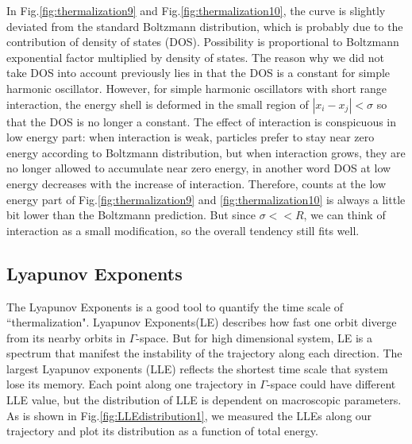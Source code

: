 \documentclass[aps,preprintnumbers,onecolumn,amsmath,amssymb,floatfix,pra]{revtex4-1}
\begin{document}
In Fig.\ref{fig:thermalization9} and Fig.\ref{fig:thermalization10}, the curve is slightly deviated from the standard Boltzmann distribution, which is probably due to the contribution of density of states (DOS). Possibility is proportional to Boltzmann exponential factor multiplied by density of states. The reason why we did not take DOS into account previously lies in that the DOS is a constant for simple harmonic oscillator. However, for simple harmonic oscillators with short range interaction, the energy shell is deformed in the small region of $|x_i-x_j|<\sigma$ so that the DOS is no longer a constant. The effect of interaction is conspicuous in low energy part: when interaction is weak, particles prefer to stay near zero energy according to Boltzmann distribution, but when interaction grows, they are no longer allowed to accumulate near zero energy, in another word DOS at low energy decreases with the increase of interaction. Therefore, counts at the low energy part of Fig.\ref{fig:thermalization9} and \ref{fig:thermalization10} is always a little bit lower than the Boltzmann prediction. But since $\sigma<<R$, we can think of interaction as a small modification, so the overall tendency still fits well. 

\subsection{Lyapunov Exponents}
The Lyapunov Exponents is a good tool to quantify the time scale of ``thermalization". Lyapunov Exponents(LE) describes how fast one orbit diverge from its nearby orbits in $\Gamma$-space. But for high dimensional system, LE is a spectrum that manifest the instability of the trajectory along each direction. The largest Lyapunov exponents (LLE) reflects the shortest time scale that system lose its memory. Each point along one trajectory in $\Gamma$-space could have different LLE value, but the distribution of LLE is dependent on macroscopic parameters. As is shown in Fig.\ref{fig:LLEdistribution1}, we measured the LLEs along our trajectory and plot its distribution as a function of total energy.
\end{document}
